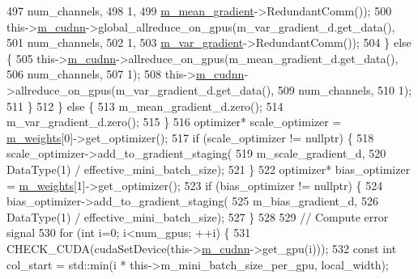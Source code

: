 \begin{DoxyCode}
497                                                 num\_channels,
498                                                 1,
499                                                 \hyperlink{classlbann_1_1batch__normalization_aa4677c2f7d5ea27c53bf0f61f280a2a3}{m\_mean\_gradient}->RedundantComm());
500         this->\hyperlink{classlbann_1_1Layer_a08dbb94239e3b8c96329786c57c72e21}{m\_cudnn}->global\_allreduce\_on\_gpus(m\_var\_gradient\_d.get\_data(),
501                                                 num\_channels,
502                                                 1,
503                                                 \hyperlink{classlbann_1_1batch__normalization_aa2d2050a265eed854aa8950cd1461af9}{m\_var\_gradient}->RedundantComm());
504       \} \textcolor{keywordflow}{else} \{
505         this->\hyperlink{classlbann_1_1Layer_a08dbb94239e3b8c96329786c57c72e21}{m\_cudnn}->allreduce\_on\_gpus(m\_mean\_gradient\_d.get\_data(),
506                                          num\_channels,
507                                          1);
508         this->\hyperlink{classlbann_1_1Layer_a08dbb94239e3b8c96329786c57c72e21}{m\_cudnn}->allreduce\_on\_gpus(m\_var\_gradient\_d.get\_data(),
509                                          num\_channels,
510                                          1);
511       \}
512     \} \textcolor{keywordflow}{else} \{
513       m\_mean\_gradient\_d.zero();
514       m\_var\_gradient\_d.zero();
515     \}
516     optimizer* scale\_optimizer = \hyperlink{classlbann_1_1Layer_a7954e30fbf9100a6ba4b56d02767a469}{m\_weights}[0]->get\_optimizer();
517     \textcolor{keywordflow}{if} (scale\_optimizer != \textcolor{keyword}{nullptr}) \{
518       scale\_optimizer->add\_to\_gradient\_staging(
519         m\_scale\_gradient\_d,
520         DataType(1) / effective\_mini\_batch\_size);
521     \}
522     optimizer* bias\_optimizer = \hyperlink{classlbann_1_1Layer_a7954e30fbf9100a6ba4b56d02767a469}{m\_weights}[1]->get\_optimizer();
523     \textcolor{keywordflow}{if} (bias\_optimizer != \textcolor{keyword}{nullptr}) \{
524       bias\_optimizer->add\_to\_gradient\_staging(
525         m\_bias\_gradient\_d,
526         DataType(1) / effective\_mini\_batch\_size);
527     \}
528 
529     \textcolor{comment}{// Compute error signal}
530     \textcolor{keywordflow}{for} (\textcolor{keywordtype}{int} i=0; i<num\_gpus; ++i) \{
531       CHECK\_CUDA(cudaSetDevice(this->\hyperlink{classlbann_1_1Layer_a08dbb94239e3b8c96329786c57c72e21}{m\_cudnn}->get\_gpu(i)));
532       \textcolor{keyword}{const} \textcolor{keywordtype}{int} col\_start = std::min(i * this->m\_mini\_batch\_size\_per\_gpu, local\_width);

\end{DoxyCode}
